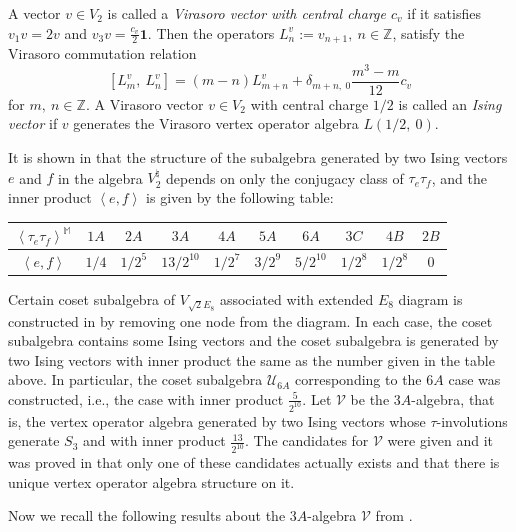 \documentclass{article}
\begin{document}
	A vector $v\in V_{2}$ is called a \emph{Virasoro
		vector with central charge $c_{v}$ }if it satisfies\emph{ $v_{1}v=2v$
	}and $v_{3}v=\frac{c_{v}}{2}\mathbf{1}$. Then the operators $L_{n}^{v}:=v_{n+1},\ n\in\mathbb{Z}$,
	satisfy the Virasoro commutation relation
	\[
	\left[L_{m}^{v},\ L_{n}^{v}\right]=\left(m-n\right)L_{m+n}^{v}+\delta_{m+n,\ 0}\frac{m^{3}-m}{12}c_{v}
	\]
	for $m,\ n\in\mathbb{Z}.$ A Virasoro vector $v\in V_{2}$ with central
	charge $1/2$ is called an \emph{Ising vector }if $v$ generates the
	Virasoro vertex operator algebra $L(1/2,\ 0)$.
	
	It is shown in \cite{C} that the structure of the subalgebra generated
	by two Ising vectors $e$ and $f$ in the algebra $V_{2}^{\natural}$
	depends on only the conjugacy class of $\tau_{e}\tau_{f}$, and the
	inner product $\left\langle e,f\right\rangle $ is given by the following
	table:
	\begin{center}
		\begin{tabular}{|c|c|c|c|c|c|c|c|c|c|}
			\hline
			$\left\langle \tau_{e}\tau_{f}\right\rangle ^{\mathbb{M}}$  & $1A$  & $2A$  & $3A$  & $4A$  & $5A$  & $6A$  & $3C$  & $4B$  & $2B$\tabularnewline
			\hline
			$\left\langle e,f\right\rangle $  & $1/4$  & $1/2^{5}$  & $13/2^{10}$  & $1/2^{7}$  & $3/2^{9}$  & $5/2^{10}$  & $1/2^{8}$  & $1/2^{8}$  & $0$\tabularnewline
			\hline
		\end{tabular}
		\par\end{center}
	
	
	Certain coset subalgebra of $V_{\sqrt{2}E_{8}}$ associated with extended
	$E_{8}$ diagram is constructed in \cite{LYY} by removing one node
	from the diagram. In each case, the coset subalgebra contains some
	Ising vectors and the coset subalgebra is generated by two Ising vectors
	with inner product the same as the number given in the table above.
	In particular, the coset subalgebra $\mathcal{U}_{6A}$ corresponding
	to the $6A$ case was constructed, i.e., the case with inner product
	$\frac{5}{2^{10}}.$ Let $\mathcal{V}$ be the $3A$-algebra, that
	is, the vertex operator algebra generated by two Ising vectors whose
	$\tau$-involutions generate $S_{3}$ and with inner product $\frac{13}{2^{10}}$.
	The candidates for $\mathcal{V}$ were given \cite{M} and it was
	proved in \cite{SY} that only one of these candidates actually exists
	and that there is unique vertex operator algebra structure on it.
	
	
	Now we recall the following results about the $3A$-algebra $\mathcal{V}$
	from \cite{SY} .
	
\end{document}
